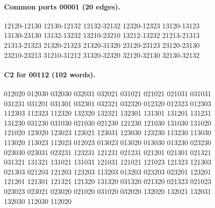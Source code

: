 \documentclass[11pt]{article}
\theoremstyle{remark}
\numberwithin{equation}{section}
\begin{document}
\paragraph{Common ports 00001 (20 edges).}
\begingroup\small\ttfamily\begin{flushleft}
12120-12130 12130-12132 12132-32132 12320-12323 13120-13123\\
13130-23130 13132-13232 13210-23210 13212-13232 21213-21313\\
21313-21323 21320-21323 21320-31320 23120-23123 23120-23130\\
23210-23213 31210-31212 31320-32320 32120-32130 32130-32132\\
\end{flushleft}\endgroup
\paragraph{C2 for 00112 (102 words).}
\begingroup\small\ttfamily\begin{flushleft}
012020 012030 032030 032031 032021 031021 021021 021031 031031\\
031231 031201 031301 032301 032321 032320 012320 012323 012303\\
112303 112323 112320 132320 132321 132301 131301 131201 131231\\
131230 031230 031030 021030 021230 121230 121030 131030 131020\\
121020 123020 123023 123021 123031 123030 123230 113230 113030\\
113020 113023 112023 012023 013023 013020 013030 013230 023230\\
023030 023031 023231 123231 121231 021231 021201 021301 021321\\
031321 131321 131021 131031 121031 121021 121023 121323 121303\\
021303 021203 121203 123203 113203 013203 023203 023201 123201\\
121201 121301 121321 121320 131320 031320 021320 021323 021023\\
023023 023021 023020 021020 031020 032020 132020 132021 132031\\
132030 112030 112020\\
\end{flushleft}\endgroup
\end{document}
